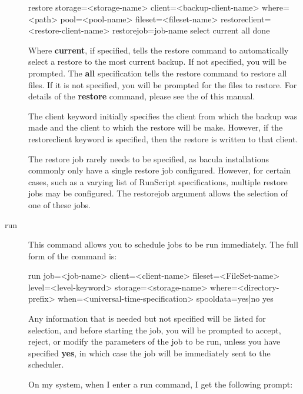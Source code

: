 \begin{description}
restore storage={\textless}storage-name{\textgreater} client={\textless}backup-client-name{\textgreater}
  where={\textless}path{\textgreater} pool={\textless}pool-name{\textgreater} fileset={\textless}fileset-name{\textgreater}
  restoreclient={\textless}restore-client-name{\textgreater}
  restorejob=\lt{}job-name\gt{}
  select current all done

   Where {\bf current}, if specified, tells the restore command to
   automatically select a restore to the most current backup.  If not
   specified, you will be prompted.  The {\bf all} specification tells the
   restore command to restore all files.  If it is not specified, you will
   be prompted for the files to restore.  For details of the {\bf restore}
   command, please see the  of this
   manual.

   The client keyword initially specifies the client from which the backup
   was made and the client to which the restore will be make.  However,
   if the restoreclient keyword is specified, then the restore is written
   to that client.

   The restore job rarely needs to be specified, as bacula installations
   commonly only have a single restore job configured. However, for certain
   cases, such as a varying list of RunScript specifications, multiple
   restore jobs may be configured. The restorejob argument allows the
   selection of one of these jobs.

\item [run]
   This command allows you to schedule jobs  to be run immediately. The full form
   of the command is:

run job={\textless}job-name{\textgreater} client={\textless}client-name{\textgreater}
  fileset={\textless}FileSet-name{\textgreater}  level={\textless}level-keyword{\textgreater}
  storage={\textless}storage-name{\textgreater}  where={\textless}directory-prefix{\textgreater}
  when={\textless}universal-time-specification{\textgreater} spooldata=yes|no yes

   Any information that is needed but not specified will be listed for
   selection, and before starting the job, you will be prompted to accept,
   reject, or modify the parameters of the job to be run, unless you have
   specified {\bf yes}, in which case the job will be immediately sent to
   the scheduler.

   On my system, when I enter a run command, I get the following  prompt:


\end{description}
